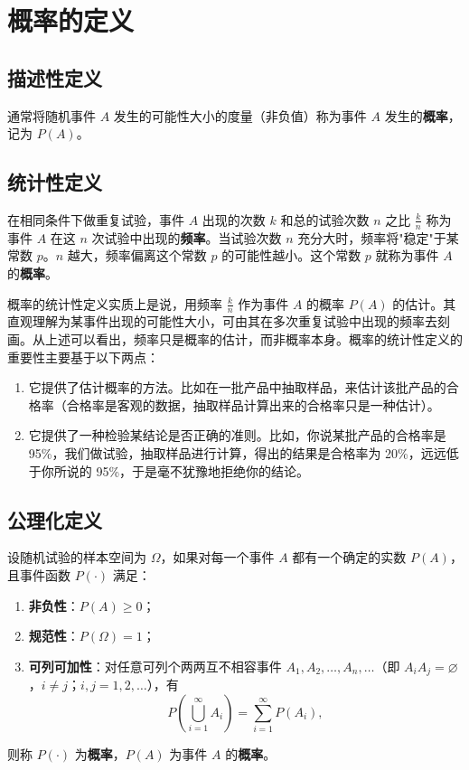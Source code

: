 \documentclass[lang=cn,11pt]{elegantbook}
\begin{document}
\section{概率的定义}

\subsection{描述性定义}

通常将随机事件 \(A\) 发生的可能性大小的度量（非负值）称为事件 \(A\) 发生的\textbf{概率}，记为 \(P(A)\)。

\subsection{统计性定义}

在相同条件下做重复试验，事件 \(A\) 出现的次数 \(k\) 和总的试验次数 \(n\) 之比 \(\frac{k}{n}\) 称为事件 \(A\) 在这 \(n\) 次试验中出现的\textbf{频率}。当试验次数 \(n\) 充分大时，频率将"稳定"于某常数 \(p\)。\(n\) 越大，频率偏离这个常数 \(p\) 的可能性越小。这个常数 \(p\) 就称为事件 \(A\) 的\textbf{概率}。

\begin{note}
概率的统计性定义实质上是说，用频率 \(\frac{k}{n}\) 作为事件 \(A\) 的概率 \(P(A)\) 的估计。其直观理解为某事件出现的可能性大小，可由其在多次重复试验中出现的频率去刻画。从上述可以看出，频率只是概率的估计，而非概率本身。概率的统计性定义的重要性主要基于以下两点：
\begin{enumerate}
    \item 它提供了估计概率的方法。比如在一批产品中抽取样品，来估计该批产品的合格率（合格率是客观的数据，抽取样品计算出来的合格率只是一种估计）。
    \item 它提供了一种检验某结论是否正确的准则。比如，你说某批产品的合格率是 95\%，我们做试验，抽取样品进行计算，得出的结果是合格率为 20\%，远远低于你所说的 95\%，于是毫不犹豫地拒绝你的结论。
\end{enumerate}
\end{note}

\subsection*{公理化定义}

\begin{definition}[概率的公理化定义] \label{def:probability-axiom}
设随机试验的样本空间为 \(\Omega\)，如果对每一个事件 \(A\) 都有一个确定的实数 \(P(A)\)，且事件函数 \(P(\cdot)\) 满足：
\begin{enumerate}
    \item \textbf{非负性}：\(P(A) \ge 0\)；
    \item \textbf{规范性}：\(P(\Omega) = 1\)；
    \item \textbf{可列可加性}：对任意可列个两两互不相容事件 \(A_1, A_2, \dots, A_n, \dots\)（即 \(A_i A_j = \varnothing\)，\(i \neq j\)；\(i, j = 1, 2, \dots\)），有
    \[
    P\!\left(\bigcup_{i=1}^{\infty} A_i\right) = \sum_{i=1}^{\infty} P(A_i),
    \]
\end{enumerate}
则称 \(P(\cdot)\) 为\textbf{概率}，\(P(A)\) 为事件 \(A\) 的\textbf{概率}。
\end{definition}
\end{document}
